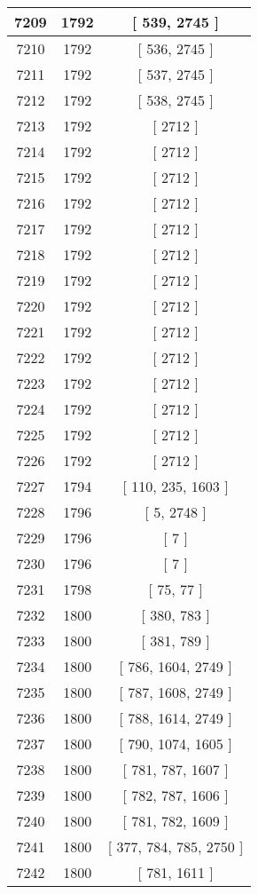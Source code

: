 \begin{center}
\begin{longtable}[H]{|| c c c ||}
\hline
7209 & 1792 & [ 539, 2745 ] \\ 
\hline
7210 & 1792 & [ 536, 2745 ] \\ 
\hline
7211 & 1792 & [ 537, 2745 ] \\ 
\hline
7212 & 1792 & [ 538, 2745 ] \\ 
\hline
7213 & 1792 & [ 2712 ] \\ 
\hline
7214 & 1792 & [ 2712 ] \\ 
\hline
7215 & 1792 & [ 2712 ] \\ 
\hline
7216 & 1792 & [ 2712 ] \\ 
\hline
7217 & 1792 & [ 2712 ] \\ 
\hline
7218 & 1792 & [ 2712 ] \\ 
\hline
7219 & 1792 & [ 2712 ] \\ 
\hline
7220 & 1792 & [ 2712 ] \\ 
\hline
7221 & 1792 & [ 2712 ] \\ 
\hline
7222 & 1792 & [ 2712 ] \\ 
\hline
7223 & 1792 & [ 2712 ] \\ 
\hline
7224 & 1792 & [ 2712 ] \\ 
\hline
7225 & 1792 & [ 2712 ] \\ 
\hline
7226 & 1792 & [ 2712 ] \\ 
\hline
7227 & 1794 & [ 110, 235, 1603 ] \\ 
\hline
7228 & 1796 & [ 5, 2748 ] \\ 
\hline
7229 & 1796 & [ 7 ] \\ 
\hline
7230 & 1796 & [ 7 ] \\ 
\hline
7231 & 1798 & [ 75, 77 ] \\ 
\hline
7232 & 1800 & [ 380, 783 ] \\ 
\hline
7233 & 1800 & [ 381, 789 ] \\ 
\hline
7234 & 1800 & [ 786, 1604, 2749 ] \\ 
\hline
7235 & 1800 & [ 787, 1608, 2749 ] \\ 
\hline
7236 & 1800 & [ 788, 1614, 2749 ] \\ 
\hline
7237 & 1800 & [ 790, 1074, 1605 ] \\ 
\hline
7238 & 1800 & [ 781, 787, 1607 ] \\ 
\hline
7239 & 1800 & [ 782, 787, 1606 ] \\ 
\hline
7240 & 1800 & [ 781, 782, 1609 ] \\ 
\hline
7241 & 1800 & [ 377, 784, 785, 2750 ] \\ 
\hline
7242 & 1800 & [ 781, 1611 ] \\ 

\end{longtable}
\end{center}

